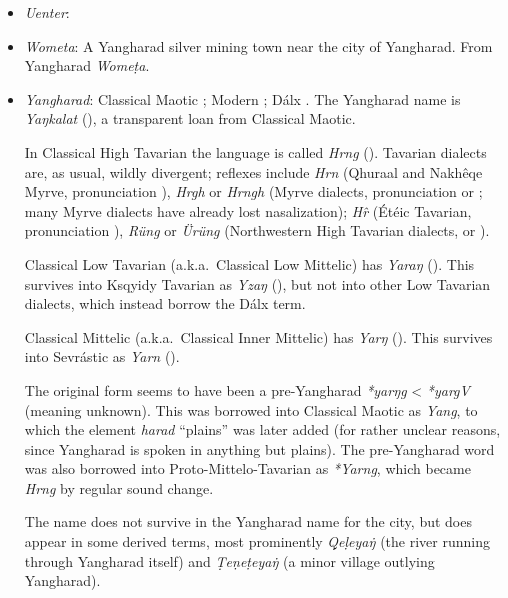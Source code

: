 \documentclass{article}
\begin{document}
\begin{itemize}
 \item \textit{Uenter}:

 \item \textit{Wometa}: A Yangharad silver mining town near the city of Yangharad. From Yangharad \textit{Wome\d{t}a}.

 \item \textit{Yangharad}: Classical Maotic ; Modern ; Dálx . The Yangharad name is \textit{Yaŋkalat} (), a transparent loan from Classical Maotic.

 In Classical High Tavarian the language is called \textit{Hrng} (). Tavarian dialects are, as usual, wildly divergent; reflexes include \textit{Hrn} (Qhuraal and Nakhêqe Myrve, pronunciation ), \textit{Hrgh} or \textit{Hrngh} (Myrve dialects, pronunciation  or ; many Myrve dialects have already lost nasalization); \textit{H\^{r}} (Étéic Tavarian, pronunciation ), \textit{Rüng} or \textit{Ürüng} (Northwestern High Tavarian dialects,  or ).

Classical Low Tavarian (a.k.a.\ Classical Low Mittelic) has \textit{Yaraŋ} (). This survives into Ksqyidy Tavarian as \textit{Yzaŋ} (), but not into other Low Tavarian dialects, which instead borrow the Dálx term.

Classical Mittelic (a.k.a.\ Classical Inner Mittelic) has \textit{Yarŋ} (). This survives into Sevrástic as \textit{Yarn} ().

 The original form seems to have been a pre-Yangharad \textit{*yarŋg} < \textit{*yargV} (meaning unknown). This was borrowed into Classical Maotic as \textit{Yang}, to which the element \textit{harad} ``plains'' was later added (for rather unclear reasons, since Yangharad is spoken in anything but plains). The pre-Yang\-harad word was also borrowed into Proto-Mittelo-Tavarian as \textit{*Yarng}, which became \textit{Hrng} by regular sound change.

 The name does not survive in the Yangharad name for the city, but does appear in some derived terms, most prominently \textit{\d{Q}e\d{l}eya\.{ŋ}} (the river running through Yangharad itself) and \textit{\d{T}e\d{n}e\d{t}eya\.{ŋ}} (a minor village outlying Yangharad).

\end{itemize}
\end{document}
